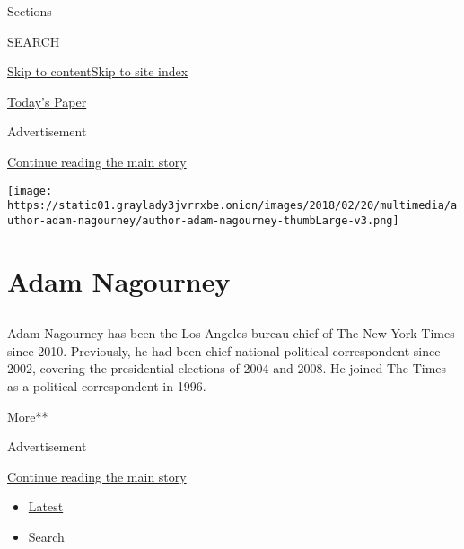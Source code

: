 Sections

SEARCH

\protect\hyperlink{site-content}{Skip to
content}\protect\hyperlink{site-index}{Skip to site index}

\href{https://myaccount.nytimes3xbfgragh.onion/auth/login?response_type=cookie\&client_id=vi}{}

\href{https://www.nytimes3xbfgragh.onion/section/todayspaper}{Today's
Paper}

Advertisement

\protect\hyperlink{after-top}{Continue reading the main story}

\texttt{[image: https://static01.graylady3jvrrxbe.onion/images/2018/02/20/multimedia/author-adam-nagourney/author-adam-nagourney-thumbLarge-v3.png]}

\hypertarget{adam-nagourney}{%
\section{Adam Nagourney}\label{adam-nagourney}}

\hypertarget{section}{%
\subsection{}\label{section}}

Adam Nagourney has been the Los Angeles bureau chief of The New York
Times since 2010. Previously, he had been chief national political
correspondent since 2002, covering the presidential elections of 2004
and 2008. He joined The Times as a political correspondent in 1996.

More**

Advertisement

\protect\hyperlink{after-mid1}{Continue reading the main story}

\begin{itemize}
\tightlist
\item
  \protect\hyperlink{stream-panel}{Latest}
\item
  Search
\end{itemize}

